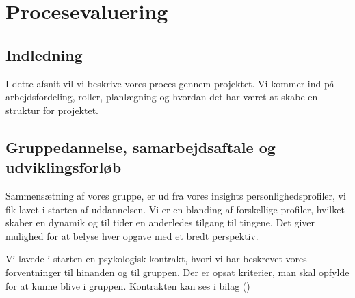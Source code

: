% 

% 

\chapter{Procesevaluering}
\label{cha:procesevaluering}

\section{Indledning}
\label{sec:indledning}

I dette afsnit vil vi beskrive vores proces gennem projektet. Vi kommer ind på arbejdsfordeling, roller, planlægning og hvordan det har været at skabe en struktur for projektet.

\section{Gruppedannelse, samarbejdsaftale og udviklingsforløb}
\label{sec:gruppe-dannelse:-}

Sammensætning af vores gruppe, er ud fra vores insights personlighedsprofiler, vi fik lavet i starten af uddannelsen. Vi er en blanding af forskellige profiler, hvilket skaber en dynamik og til tider en anderledes tilgang til tingene. Det giver mulighed for at belyse hver opgave med et bredt perspektiv.  


Vi lavede i starten en psykologisk kontrakt, hvori vi har beskrevet vores forventninger til hinanden og til gruppen. Der er opsat kriterier, man skal opfylde for at kunne blive i gruppen. %
Kontrakten kan ses i bilag ()


